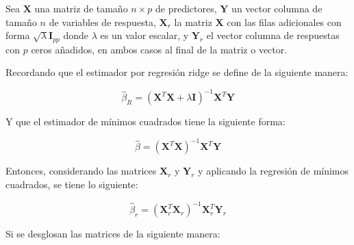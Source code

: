 \documentclass[11pt]{article}
\begin{document}
Sea \(\mathbf{X}\) una matriz de tamaño \(n\times p\) de predictores,
\(\mathbf{Y}\) un vector columna de tamaño \(n\) de variables de
respuesta, \(\mathbf{X}_r\) la matriz \(\mathbf{X}\) con las filas
adicionales con forma \(\sqrt{\lambda} \mathbf{I}_{pp}\) donde
\(\lambda\) es un valor escalar, y \(\mathbf{Y}_r\) el vector columna de
respuestas con \(p\) ceros añadidos, en ambos casos al final de la
matriz o vector.

Recordando que el estimador por regresión ridge se define de la
siguiente manera:

\[
\hat{\beta}_R = \left(\mathbf{X}^T\mathbf{X} + \lambda \mathbf{I}\right)^{-1}\mathbf{X}^T\mathbf{Y}\tag{1}
\]

Y que el estimador de mínimos cuadrados tiene la siguiente forma:

\[
\hat{\beta} = \left(\mathbf{X}^T\mathbf{X}\right)^{-1}\mathbf{X}^T\mathbf{Y}\tag{2}
\]

Entonces, considerando las matrices \(\mathbf{X}_r\) y \(\mathbf{Y}_r\)
y aplicando la regresión de mínimos cuadrados, se tiene lo siguiente:

\[
\hat{\beta}_r = \left(\mathbf{X}_r^T\mathbf{X}_r\right)^{-1}\mathbf{X}_r^T\mathbf{Y}_r\tag{3}
\]

Si se desglosan las matrices de la siguiente manera:
\end{document}
